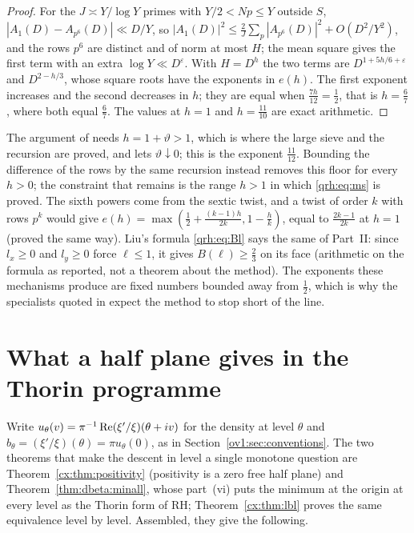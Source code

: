 \begin{proof}
For the $J\asymp Y/\log Y$ primes with $Y/2<Np\le Y$ outside $S$, $|A_1(D)-A_{p^6}(D)|\ll D/Y$, so $|A_1(D)|^2\le\frac2J\sum_p|A_{p^6}(D)|^2+O(D^2/Y^2)$, and the rows $p^6$ are distinct and of norm at most $H$; the mean square gives the first term with an extra $\log Y\ll D^\varepsilon$. With $H=D^h$ the two terms are $D^{1+5h/6+\varepsilon}$ and $D^{2-h/3}$, whose square roots have the exponents in $e(h)$. The first exponent increases and the second decreases in $h$; they are equal when $\frac{7h}{12}=\frac12$, that is $h=\frac67$, where both equal $\frac67$. The values at $h=1$ and $h=\frac{11}{10}$ are exact arithmetic.
\end{proof}

The argument of \cite{OAI26b} needs $h=1+\vartheta>1$, which is where the large sieve and the recursion are proved, and lets $\vartheta\downarrow0$; this is the exponent $\frac{11}{12}$. Bounding the difference of the rows by the same recursion instead removes this floor for every $h>0$; the constraint that remains is the range $h>1$ in which \eqref{qrh:eq:ms} is proved. The sixth powers come from the sextic twist, and a twist of order $k$ with rows $p^k$ would give $e(h)=\max(\frac12+\frac{(k-1)h}{2k},1-\frac hk)$, equal to $\frac{2k-1}{2k}$ at $h=1$ (proved the same way). Liu's formula \eqref{qrh:eq:Bl} says the same of Part~II: since $l_x\ge0$ and $l_y\ge0$ force $\ell\le1$, it gives $B(\ell)\ge\frac23$ on its face (arithmetic on the formula as reported, not a theorem about the method). The exponents these mechanisms produce are fixed numbers bounded away from $\frac12$, which is why the specialists quoted in \cite{NCQuanta26} expect the method to stop short of the line.

\section{What a half plane gives in the Thorin programme}\label{qrh:sec:thorin}

Write $u_\theta(v)=\pi^{-1}\operatorname{Re}(\xi'/\xi)(\theta+iv)$ for the density at level $\theta$ and $b_\theta=(\xi'/\xi)(\theta)=\pi u_\theta(0)$, as in Section~\ref{ov1:sec:conventions}. The two theorems that make the descent in level a single monotone question are Theorem~\ref{cx:thm:positivity} (positivity is a zero free half plane) and Theorem~\ref{thm:dbeta:minall}, whose part~(vi) puts the minimum at the origin at every level as the Thorin form of RH; Theorem~\ref{cx:thm:lbl} proves the same equivalence level by level. Assembled, they give the following.

